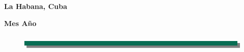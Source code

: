 \begin{titlepage}
	\vspace{1em}	
	
	\begin{center}
		\sf \textbf{La Habana, Cuba}
		
		\sf \textbf{Mes Año}
		
		\begin{figure}
			\includegraphics[width=17cm,height=1cm]{Figuras/separador.png}
		\end{figure}
	\end{center}

\end{titlepage}